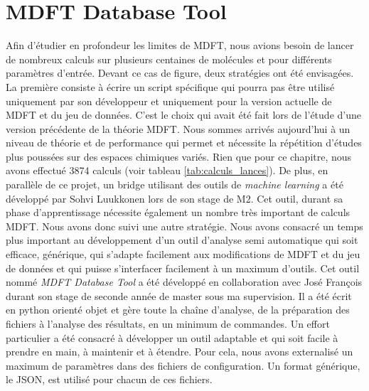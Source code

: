 \section{MDFT Database Tool}
Afin d'étudier en profondeur les limites de MDFT, nous avions besoin de lancer de nombreux calculs sur plusieurs centaines de molécules et pour différents paramètres d'entrée. Devant ce cas de figure, deux stratégies ont été envisagées. La première consiste à écrire un script spécifique qui pourra pas être utilisé uniquement par son développeur et uniquement pour la version actuelle de MDFT et du jeu de données. C'est le choix qui avait été fait lors de l'étude d'une version précédente de la théorie MDFT\cite{sergiievskyi_fast_2014, sergiievskyi_solvation_2015}. Nous sommes arrivés aujourd'hui à un niveau de théorie et de performance qui permet et nécessite la répétition d'études plus poussées sur des espaces chimiques variés. Rien que pour ce chapitre, nous avons effectué 3874 calculs (voir tableau \ref{tab:calculs_lances}). De plus, en parallèle de ce projet, un bridge utilisant des outils de \textit{machine learning} a été développé par Sohvi Luukkonen lors de son stage de M2. Cet outil, durant sa phase d'apprentissage nécessite également un nombre très important de calculs MDFT. Nous avons donc suivi une autre stratégie. Nous avons consacré un temps plus important au développement d'un outil d'analyse semi automatique qui soit efficace, générique, qui s'adapte facilement aux modifications de MDFT et du jeu de données et qui puisse s'interfacer facilement à un maximum d'outils. Cet outil nommé \textit{MDFT Database Tool} a été développé en collaboration avec José François durant son stage de seconde année de master sous ma supervision. Il a été écrit en python orienté objet et gère toute la chaîne d'analyse, de la préparation des fichiers à l'analyse des résultats, en un minimum de commandes. Un effort particulier a été consacré à développer un outil adaptable et qui soit facile à prendre en main, à maintenir et à étendre. Pour cela, nous avons externalisé un maximum de paramètres dans des fichiers de configuration. Un format générique, le JSON, est utilisé pour chacun de ces fichiers.




